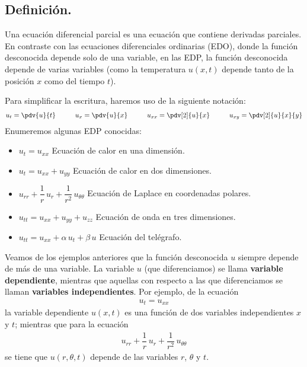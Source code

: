\subsection*{Definición.}
Una ecuación diferencial parcial es una ecuación que contiene derivadas parciales. En contraste con las ecuaciones diferenciales ordinarias (EDO), donde la función desconocida depende solo de una variable, en las EDP, la función desconocida depende de varias variables (como la temperatura $u (x, t)$ depende tanto de la posición $x$ como del tiempo $t$).
\par
Para simplificar la escritura, haremos uso de la siguiente notación:
\begin{align*}
u_{t} = \pdv{u}{t} \hspace{1cm} u_{x} = \pdv{u}{x} \hspace{1cm} u_{xx} = \pdv[2]{u}{x} \hspace{1cm} u_{xy} = \pdv[2]{u}{x}{y}
\end{align*}
Enumeremos algunas EDP conocidas:
\begin{itemize}
\item $u_{t} = u_{xx}$ \hspace{3.5cm} Ecuación de calor en una dimensión.
\item $u_{t} = u_{xx} + u_{yy}$ \hspace{2.3cm} Ecuación de calor en dos dimensiones.
\item $u_{rr} + \dfrac{1}{r} \, u_{r} + \dfrac{1}{r^{2}} \, u_{\theta \theta}$ \hspace{2cm} Ecuación de Laplace en coordenadas polares.
\item $u_{tt} = u_{xx} + u_{yy} + u_{zz}$ \hspace{1cm} Ecuación de onda en tres dimensiones.
\item $u_{tt} = u_{xx} + \alpha \, u_{t} + \beta \, u$ \hspace{0.9cm} Ecuación del telégrafo.
\end{itemize}
Veamos de los ejemplos anteriores que la función desconocida $u$ siempre depende de más de una variable. La variable $u$ (que diferenciamos) se llama \textbf{variable dependiente}, mientras que aquellas con respecto a las que diferenciamos se llaman \textbf{variables independientes}. Por ejemplo, de la ecuación
\begin{align*}
u_{t} = u_{xx}
\end{align*}
la variable dependiente $u(x, t)$ es una función de dos variables independientes $x$ y $t$; mientras que para la ecuación
\begin{align*}
u_{rr} + \dfrac{1}{r} \, u_{r} + \dfrac{1}{r^{2}} \, u_{\theta \theta}
\end{align*}
se tiene que $u(r, \theta, t)$ depende de las variables $r$, $\theta$ y $t$.
